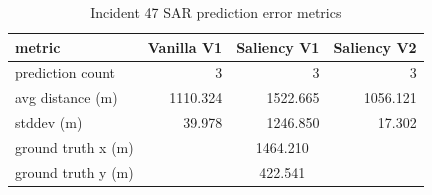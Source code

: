 \begin{table}[ht]
\centering
\caption{Incident 47 SAR prediction error metrics}
\label{tab:sar-incident-47}
\begin{tabular}{lrrr}
\hline
metric & Vanilla V1 & Saliency V1 & Saliency V2 \\
\hline
prediction count & 3 & 3 & 3 \\
avg distance (m) & 1110.324 & 1522.665 & 1056.121 \\
stddev (m) & 39.978 & 1246.850 & 17.302 \\
ground truth x (m) & \multicolumn{3}{c}{1464.210} \\
ground truth y (m) & \multicolumn{3}{c}{422.541} \\
\hline
\end{tabular}
\end{table}
